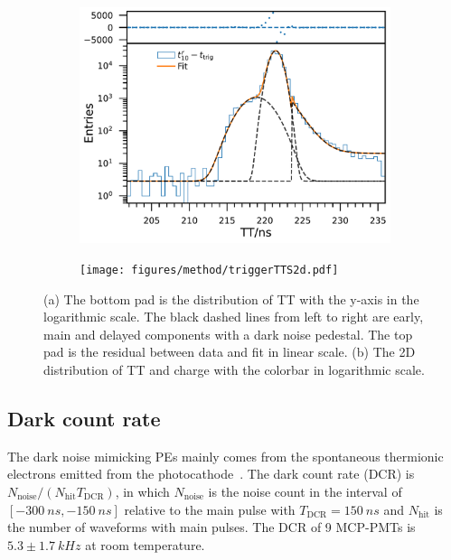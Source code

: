 \begin{figure}[!htbp]
    \centering
    \begin{subfigure}[t]{\SF\textwidth}
        \includegraphics[width=\textwidth]{figures/method/triggerTTSLog.pdf}
        \caption{}%
        \label{fig:triggerTTSLog}
    \end{subfigure}
    \begin{subfigure}[t]{\SF\textwidth}
        \texttt{[image: figures/method/triggerTTS2d.pdf]}
        \caption{}%
        \label{fig:triggerTTS2d}
    \end{subfigure}
    \caption{(a) The bottom pad is the distribution of TT with the y-axis in the logarithmic scale. The black dashed lines from left to right are early, main and delayed components with a dark noise pedestal. The top pad is the residual between data and fit in linear scale. (b) The 2D distribution of TT and charge with the colorbar in logarithmic scale.}
\end{figure}

\subsection{Dark count rate}
\label{sec:dcr}
The dark noise mimicking PEs mainly comes from the spontaneous thermionic electrons emitted from the photocathode~\cite{KM3NetTesting}. The dark count rate (DCR) is ${N_{\mathrm{noise}}}/({N_{\mathrm{hit}}T_{\mathrm{DCR}}})$, in which $N_{\mathrm{noise}}$ is the noise count in the interval of $[\SI{-300}{ns},\SI{-150}{ns}]$ relative to the main pulse with $T_{\mathrm{DCR}}=\SI{150}{ns}$ and $N_{\mathrm{hit}}$ is the number of waveforms with main pulses. The DCR of 9 MCP-PMTs is $5.3\pm\SI{1.7}{kHz}$ at room temperature.

